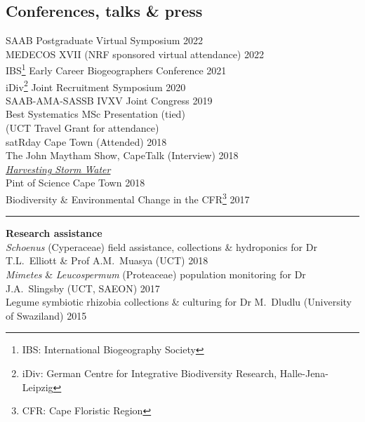 \documentclass[10pt]{article}
\begin{document}
\begin{multicols}{2}
\subsection*{Conferences, talks \& press} %

SAAB Postgraduate Virtual Symposium                      \hfill {\small 2022} \\
MEDECOS XVII {\small (NRF sponsored virtual attendance)} \hfill {\small 2022} \\
IBS\footnote{IBS: International Biogeography Society}
  Early Career Biogeographers Conference                 \hfill {\small 2021} \\
iDiv\footnote{iDiv: German Centre for Integrative
  Biodiversity Research, Halle-Jena-Leipzig} Joint
  Recruitment Symposium                                  \hfill {\small 2020} \\
SAAB-AMA-SASSB IVXV Joint Congress                       \hfill {\small 2019} \\
  \hspace{2em} {\small Best Systematics MSc Presentation
    (tied)}                                                                   \\
  \hspace{2em} {\small (UCT Travel Grant for attendance)}                     \\
satRday Cape Town {\small (Attended)}                    \hfill {\small 2018} \\
The John Maytham Show, CapeTalk {\small (Interview)}     \hfill {\small 2018} \\
  \hspace{2em} {\small \href{https://www.capetalk.co.za/articles/328900/harvesting-stormwater-from-liesbeek-river-may-aid-ct-water-supply-students-find}
    {\textit{Harvesting Storm Water}}}                                        \\
Pint of Science Cape Town                                \hfill {\small 2018} \\
Biodiversity \& Environmental Change in the CFR\footnote{
  CFR: Cape Floristic Region}                            \hfill {\small 2017}

\end{multicols} %

\hrule

\textbf{Research assistance} \\ %
\textit{Schoenus} (Cyperaceae)
  field assistance, collections \& hydroponics
  for Dr T.L.~Elliott \& Prof A.M.~Muasya
  {\small (UCT)}                                         \hfill {\small 2018} \\
\textit{Mimetes} \& \textit{Leucospermum} (Proteaceae)
  population monitoring
  for Dr J.A.~Slingsby
  {\small (UCT, SAEON)}                                  \hfill {\small 2017} \\
Legume symbiotic rhizobia
  collections \& culturing
  for Dr M.~Dludlu
  {\small (University of Swaziland)}                     \hfill {\small 2015} \\
\end{document}
